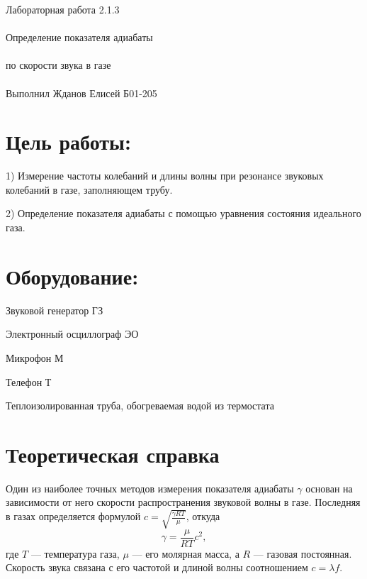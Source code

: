 \documentclass{astroedu-lab}
\begin{document}
\pagestyle{plain}

\begin{problem}{\huge Лабораторная работа 2.1.3\\\\Определение показателя адиабаты\\\\по скорости звука в газе\\\\Выполнил Жданов Елисей Б01-205}

\section{Цель работы:}

1) Измерение частоты колебаний и длины волны при резонансе звуковых колебаний в газе, заполняющем трубу.

2) Определение показателя адиабаты с помощью уравнения состояния идеального газа.

\section{Оборудование:}

Звуковой генератор ГЗ

Электронный осциллограф ЭО

Микрофон М

Телефон Т

Теплоизолированная труба, обогреваемая водой из термостата


\section{Теоретическая справка}

Один из наиболее точных методов измерения показателя адиабаты $\gamma$ основан на зависимости от него скорости распространения звуковой волны в газе. Последняя в газах определяется формулой $c = \sqrt{\frac{\gamma RT}{\mu}}$, откуда
 	\begin{equation}
 	\gamma = \frac{\mu}{RT}c^2,
 	\end{equation}
где $T$ --- температура газа, $\mu$ --- его молярная масса, а $R$ --- газовая постоянная. \\
Скорость звука связана с его частотой и длиной волны соотношением $c = \lambda f.$


\end{problem}
\end{document}

